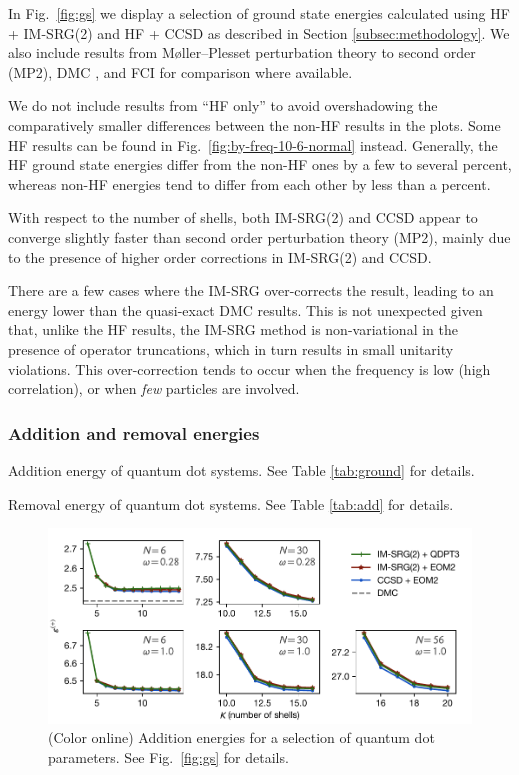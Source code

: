 In Fig.\ \ref{fig:gs} we display a selection of ground state energies calculated using HF + IM-SRG(2) and HF + CCSD as described in Section \ref{subsec:methodology}.  We also include results from M\o ller--Plesset perturbation theory to second order (MP2), DMC \cite{hoegberget2013thesis}, and FCI \cite{olsen2013thesis} for comparison where available.

We do not include results from ``HF only'' to avoid overshadowing the comparatively smaller differences between the non-HF results in the plots.  Some HF results can be found in Fig.\ \ref{fig:by-freq-10-6-normal} instead.  Generally, the HF ground state energies differ from the non-HF ones by a few to several percent, whereas non-HF energies tend to differ from each other by less than a percent.

With respect to the number of shells, both IM-SRG(2) and CCSD appear to converge slightly faster than second order perturbation theory (MP2), mainly due to the presence of higher order corrections in IM-SRG(2) and CCSD.

There are a few cases where the IM-SRG over-corrects the result, leading to an energy lower than the quasi-exact DMC results.  This is not unexpected given that, unlike the HF results, the IM-SRG method is non-variational in the presence of operator truncations, which in turn results in small unitarity violations.  This over-correction tends to occur when the frequency is low (high correlation), or when \emph{few} particles are involved.

\subsubsection{Addition and removal energies}

\begin{table}
  \centering
  \caption{Addition energy of quantum dot systems.  See Table \ref{tab:ground} for details.}
  \label{tab:add}
  \unskip
\end{table}

\begin{table}
  \centering
  \caption{Removal energy of quantum dot systems.  See Table \ref{tab:add} for details.}
  \label{tab:rm}
  \unskip
\end{table}

\begin{figure}
  \centering
  \includegraphics{fig-add2.pdf}
  \caption{(Color online) Addition energies for a selection of quantum dot parameters.  See Fig.\ \ref{fig:gs} for details.}
  \label{fig:add}
\end{figure}

